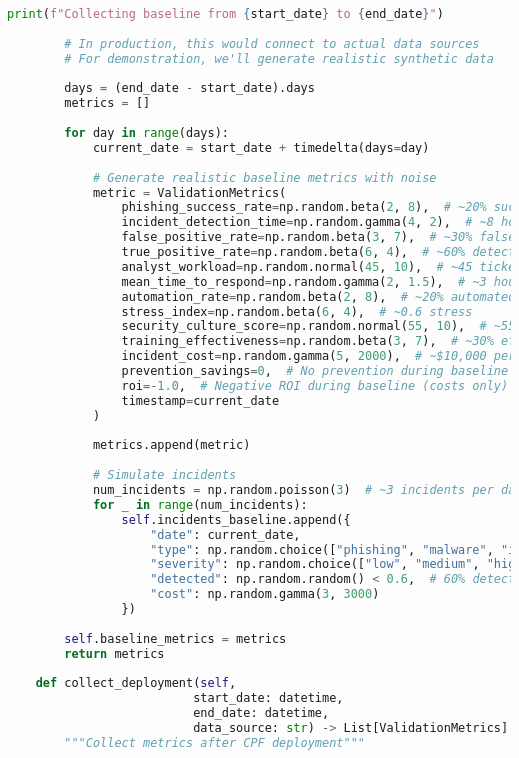 \documentclass[11pt,a4paper]{article}
\begin{document}
\begin{lstlisting}[language=Python, caption=CPF Validation Framework]
        print(f"Collecting baseline from {start_date} to {end_date}")
        
        # In production, this would connect to actual data sources
        # For demonstration, we'll generate realistic synthetic data
        
        days = (end_date - start_date).days
        metrics = []
        
        for day in range(days):
            current_date = start_date + timedelta(days=day)
            
            # Generate realistic baseline metrics with noise
            metric = ValidationMetrics(
                phishing_success_rate=np.random.beta(2, 8),  # ~20% success rate
                incident_detection_time=np.random.gamma(4, 2),  # ~8 hours
                false_positive_rate=np.random.beta(3, 7),  # ~30% false positives
                true_positive_rate=np.random.beta(6, 4),  # ~60% detection
                analyst_workload=np.random.normal(45, 10),  # ~45 tickets/day
                mean_time_to_respond=np.random.gamma(2, 1.5),  # ~3 hours
                automation_rate=np.random.beta(2, 8),  # ~20% automated
                stress_index=np.random.beta(6, 4),  # ~0.6 stress
                security_culture_score=np.random.normal(55, 10),  # ~55/100
                training_effectiveness=np.random.beta(3, 7),  # ~30% effective
                incident_cost=np.random.gamma(5, 2000),  # ~$10,000 per incident
                prevention_savings=0,  # No prevention during baseline
                roi=-1.0,  # Negative ROI during baseline (costs only)
                timestamp=current_date
            )
            
            metrics.append(metric)
            
            # Simulate incidents
            num_incidents = np.random.poisson(3)  # ~3 incidents per day
            for _ in range(num_incidents):
                self.incidents_baseline.append({
                    "date": current_date,
                    "type": np.random.choice(["phishing", "malware", "insider", "other"]),
                    "severity": np.random.choice(["low", "medium", "high"], p=[0.6, 0.3, 0.1]),
                    "detected": np.random.random() < 0.6,  # 60% detection rate
                    "cost": np.random.gamma(3, 3000)
                })
        
        self.baseline_metrics = metrics
        return metrics
    
    def collect_deployment(self,
                          start_date: datetime,
                          end_date: datetime,
                          data_source: str) -> List[ValidationMetrics]:
        """Collect metrics after CPF deployment"""
        

\end{lstlisting}
\end{document}
